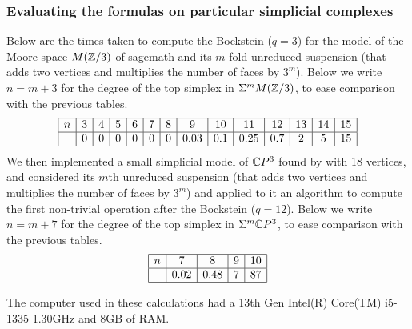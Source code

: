 \subsubsection{Evaluating the formulas on particular simplicial complexes}
Below are the times taken to compute the Bockstein ($q=3$) for the model of the Moore space $M(\mathbb{Z}/3)$ of sagemath and its $m$-fold unreduced suspension (that adds two vertices and multiplies the number of faces by $3^m$). Below we write $n=m+3$ for the degree of the top simplex in $\Sigma^{m}M(\mathbb{Z}/3)$, to ease comparison with the previous tables.
\[
\begin{array}{|c|c|c|c|c|c|c|c|c|c|c|c|c|c|c|}\hline 
	n &3 & 4 & 5 & 6 & 7 & 8 & 9  & 10 & 11    & 12 & 13 & 14 & 15\\ \hline
	  &0 & 0  & 0 & 0 & 0 & 0 & 0.03  & 0.1 & 0.25 & 0.7 & 2 & 5 & 15\\ \hline
\end{array}
\]
We then implemented a small simplicial model of $\mathbb{C} P^3$ found by \cite{datta} with 18 vertices, and considered its $m$th unreduced suspension (that adds two vertices and multiplies the number of faces by $3^m$) and applied to it an algorithm to compute the first non-trivial operation after the Bockstein ($q=12$). Below we write $n=m+7$ for the degree of the top simplex in $\Sigma^{m}\mathbb{C} P^3$, to ease comparison with the previous tables.
\[
\begin{array}{|c|c|c|c|c|}\hline 
	n & 7     & 8    & 9 & 10 \\ \hline
	  & 0.02  & 0.48 & 7 & 87 \\ \hline
\end{array}
\]


The computer used in these calculations had a 13th Gen Intel(R) Core(TM) i5-1335 1.30GHz and 8GB of RAM. %